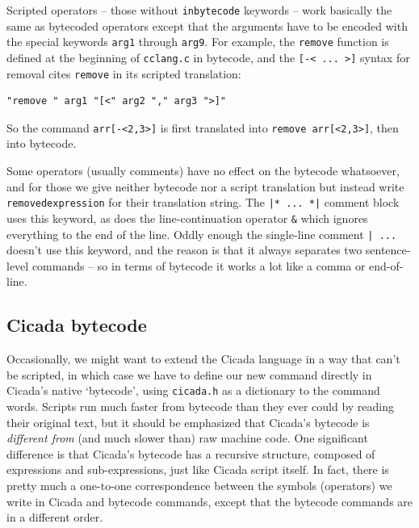 \documentclass{article}
\newenvironment{code}{
       \begin{list}{}{
               \setlength{\leftmargin}{.4in}
               \setlength{\rightmargin}{0in}
               \setlength{\topsep}{.2in}
       }
       \small
       \item[] }
       { \end{list}   }
\begin{document}
Scripted operators -- those without \verb#inbytecode# keywords -- work basically the same as bytecoded operators except that the arguments have to be encoded with the special keywords \verb#arg1# through \verb#arg9#.  For example, the \verb#remove# function is defined at the beginning of \verb#cclang.c# in bytecode, and the \verb#[-< ... >]# syntax for removal cites \verb#remove# in its scripted translation:

\begin{code} \begin{verbatim}
"remove " arg1 "[<" arg2 "," arg3 ">]"
\end{verbatim} \end{code}

\noindent So the command \verb#arr[-<2,3>]# is first translated into \verb$remove arr[<2,3>]$, then into bytecode.

Some operators (usually comments) have no effect on the bytecode whatsoever, and for those we give neither bytecode nor a script translation but instead write \verb#removedexpression# for their translation string.  The \verb#|* ... *|# comment block uses this keyword, as does the line-continuation operator \verb#&# which ignores everything to the end of the line.  Oddly enough the single-line comment \verb#| ...# doesn't use this keyword, and the reason is that it always separates two sentence-level commands -- so in terms of bytecode it works a lot like a comma or end-of-line. 






\subsection{Cicada bytecode}

Occasionally, we might want to extend the Cicada language in a way that can't be scripted, in which case we have to define our new command directly in Cicada's native `bytecode', using \verb#cicada.h# as a dictionary to the command words.  Scripts run much faster from bytecode than they ever could by reading their original text, but it should be emphasized that Cicada's bytecode is \emph{different from} (and much slower than) raw machine code.  One significant difference is that Cicada's bytecode has a recursive structure, composed of expressions and sub-expressions, just like Cicada script itself.  In fact, there is pretty much a one-to-one correspondence between the symbols (operators) we write in Cicada and bytecode commands, except that the bytecode commands are in a different order.
\end{document}
